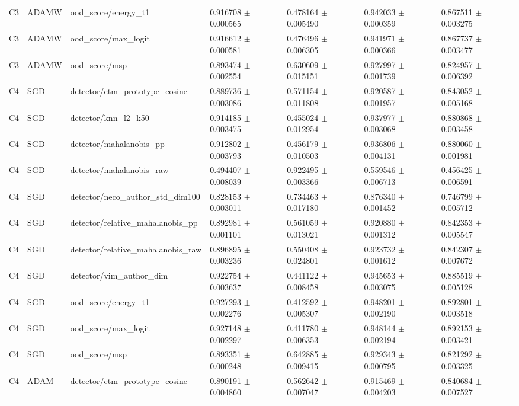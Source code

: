 \begin{longtable}{lllllll}
C3 & ADAMW & ood\_score/energy\_t1 & 0.916708 $\pm$ 0.000565 & 0.478164 $\pm$ 0.005490 & 0.942033 $\pm$ 0.000359 & 0.867511 $\pm$ 0.003275 \\
C3 & ADAMW & ood\_score/max\_logit & 0.916612 $\pm$ 0.000581 & 0.476496 $\pm$ 0.006305 & 0.941971 $\pm$ 0.000366 & 0.867737 $\pm$ 0.003477 \\
C3 & ADAMW & ood\_score/msp & 0.893474 $\pm$ 0.002554 & 0.630609 $\pm$ 0.015151 & 0.927997 $\pm$ 0.001739 & 0.824957 $\pm$ 0.006392 \\
C4 & SGD & detector/ctm\_prototype\_cosine & 0.889736 $\pm$ 0.003086 & 0.571154 $\pm$ 0.011808 & 0.920587 $\pm$ 0.001957 & 0.843052 $\pm$ 0.005168 \\
C4 & SGD & detector/knn\_l2\_k50 & 0.914185 $\pm$ 0.003475 & 0.455024 $\pm$ 0.012954 & 0.937977 $\pm$ 0.003068 & 0.880868 $\pm$ 0.003458 \\
C4 & SGD & detector/mahalanobis\_pp & 0.912802 $\pm$ 0.003793 & 0.456179 $\pm$ 0.010503 & 0.936806 $\pm$ 0.004131 & 0.880060 $\pm$ 0.001981 \\
C4 & SGD & detector/mahalanobis\_raw & 0.494407 $\pm$ 0.008039 & 0.922495 $\pm$ 0.003366 & 0.559546 $\pm$ 0.006713 & 0.456425 $\pm$ 0.006591 \\
C4 & SGD & detector/neco\_author\_std\_dim100 & 0.828153 $\pm$ 0.003011 & 0.734463 $\pm$ 0.017180 & 0.876340 $\pm$ 0.001452 & 0.746799 $\pm$ 0.005712 \\
C4 & SGD & detector/relative\_mahalanobis\_pp & 0.892981 $\pm$ 0.001101 & 0.561059 $\pm$ 0.013021 & 0.920880 $\pm$ 0.001312 & 0.842353 $\pm$ 0.005547 \\
C4 & SGD & detector/relative\_mahalanobis\_raw & 0.896895 $\pm$ 0.003236 & 0.550408 $\pm$ 0.024801 & 0.923732 $\pm$ 0.001612 & 0.842307 $\pm$ 0.007672 \\
C4 & SGD & detector/vim\_author\_dim & 0.922754 $\pm$ 0.003637 & 0.441122 $\pm$ 0.008458 & 0.945653 $\pm$ 0.003075 & 0.885519 $\pm$ 0.005128 \\
C4 & SGD & ood\_score/energy\_t1 & 0.927293 $\pm$ 0.002276 & 0.412592 $\pm$ 0.005307 & 0.948201 $\pm$ 0.002190 & 0.892801 $\pm$ 0.003518 \\
C4 & SGD & ood\_score/max\_logit & 0.927148 $\pm$ 0.002297 & 0.411780 $\pm$ 0.006353 & 0.948144 $\pm$ 0.002194 & 0.892153 $\pm$ 0.003421 \\
C4 & SGD & ood\_score/msp & 0.893351 $\pm$ 0.000248 & 0.642885 $\pm$ 0.009415 & 0.929343 $\pm$ 0.000795 & 0.821292 $\pm$ 0.003325 \\
C4 & ADAM & detector/ctm\_prototype\_cosine & 0.890191 $\pm$ 0.004860 & 0.562642 $\pm$ 0.007047 & 0.915469 $\pm$ 0.004203 & 0.840684 $\pm$ 0.007527 \\

\end{longtable}
